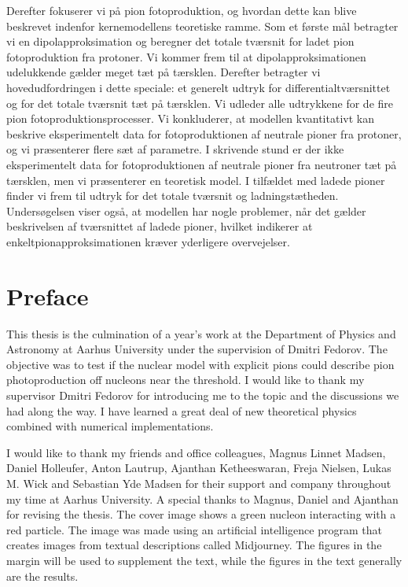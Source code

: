 Derefter fokuserer vi på pion fotoproduktion, og hvordan dette kan blive beskrevet indenfor kernemodellens teoretiske ramme. Som et første mål betragter vi en dipolapproksimation og beregner det totale tværsnit for ladet pion fotoproduktion fra protoner. Vi kommer frem til at dipolapproksimationen udelukkende gælder meget tæt på tærsklen. Derefter betragter vi hovedudfordringen i dette speciale: et generelt udtryk for differentialtværsnittet og for det totale tværsnit tæt på tærsklen. Vi udleder alle udtrykkene for de fire pion fotoproduktionsprocesser. Vi konkluderer, at modellen kvantitativt kan beskrive eksperimentelt data for fotoproduktionen af neutrale pioner fra protoner, og vi præsenterer flere sæt af parametre. I skrivende stund er der ikke eksperimentelt data for fotoproduktionen af neutrale pioner fra neutroner tæt på tærsklen, men vi præsenterer en teoretisk model. I tilfældet med ladede pioner finder vi frem til udtryk for det totale tværsnit og ladningstætheden. Undersøgelsen viser også, at modellen har nogle problemer, når det gælder beskrivelsen af tværsnittet af ladede pioner, hvilket indikerer at enkeltpionapproksimationen kræver yderligere overvejelser.

\newpage
\section*{Preface}
\thispagestyle{empty}
This thesis is the culmination of a year's work at the Department of Physics and Astronomy at Aarhus University under the supervision of Dmitri Fedorov. The objective was to test if the nuclear model with explicit pions could describe pion photoproduction off nucleons near the threshold.
I would like to thank my supervisor Dmitri Fedorov for introducing me to the topic and the discussions we had along the way. I have learned a great deal of new theoretical physics combined with numerical implementations. 

I would like to thank my friends and office colleagues, Magnus Linnet Madsen, Daniel Holleufer, Anton Lautrup, Ajanthan Ketheeswaran, Freja Nielsen, Lukas M. Wick and Sebastian Yde Madsen for their support and company throughout my time at Aarhus University. A special thanks to Magnus, Daniel and Ajanthan for revising the thesis.
The cover image shows a green nucleon interacting with a red particle. The image was made using an artificial intelligence program that creates images from textual descriptions called Midjourney. The figures in the margin will be used to supplement the text, while the figures in the text generally are the results.
\vspace{1cm}
\clearpage
\thispagestyle{empty}\mbox{}
\clearpage
